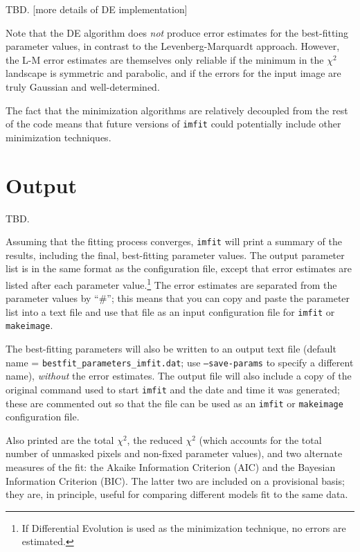 \documentclass[10pt]{article}
\newcommand{\imfit}{\texttt{imfit}}
\newcommand{\makeimage}{\texttt{makeimage}}
\begin{document}
\medskip

TBD. [more details of DE implementation]

\medskip

Note that the DE algorithm does \textit{not} produce error estimates for the best-fitting
parameter values, in contrast to
the Levenberg-Marquardt approach. However, the L-M error estimates are themselves only
reliable if the minimum in the $\chi^{2}$ landscape is symmetric and parabolic, and if
the errors for the input image are truly Gaussian and well-determined.

\medskip

The fact that the minimization algorithms are relatively decoupled from the rest
of the code means that future versions of \imfit{} could potentially include other minimization
techniques.



\section{Output}

TBD.

Assuming that the fitting process converges, \imfit{} will print a summary of
the results, including the final, best-fitting parameter values. The output
parameter list is in the same format as the configuration file, except that
error estimates are listed after each parameter value.\footnote{If Differential
Evolution is used as the minimization technique, no errors are estimated.} The
error estimates are separated from the parameter values by ``\#''; this means
that you can copy and paste the parameter list into a text file and use that
file as an input configuration file for \imfit{} or \makeimage. 

The best-fitting parameters will also be written to an output text file (default
name = \texttt{bestfit\_parameters\_imfit.dat}; use \texttt{--save-params} to
specify a different name), \textit{without} the error estimates. The output file
will also include a copy of the original command used to start \imfit{} and the
date and time it was generated; these are commented out so that the file can be
used as an \imfit{} or \makeimage{} configuration file.

Also printed are the total $\chi^{2}$, the reduced $\chi^{2}$ (which accounts for the
total number of unmasked pixels and non-fixed parameter values), and two alternate
measures of the fit: the Akaike Information Criterion (AIC) and the Bayesian Information
Criterion (BIC). The latter two are included on a provisional basis; they are,
in principle, useful for comparing different models fit to the same data.
\end{document}
